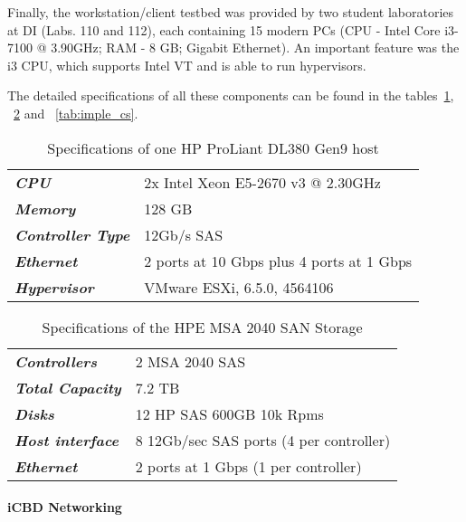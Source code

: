 Finally, the workstation/client testbed was provided by two student laboratories at DI (Labs. 110 and 112), each containing 15 modern PCs (CPU - Intel Core i3-7100 @ 3.90GHz; RAM - 8 GB; Gigabit Ethernet). An important feature was the i3 CPU, which supports Intel VT and is able to run hypervisors.


The detailed specifications of all these components can be found in the tables~\ref{tab:imple_hp}, ~\ref{tab:imple_msa} and ~\ref{tab:imple_cs}.


\begin{table}[htpb]
\centering
\begin{tabular}{ll}
\textit{\textbf{CPU}}             & 2x Intel Xeon E5-2670 v3 @ 2.30GHz        \\
\textit{\textbf{Memory}}          & 128 GB                                    \\
\textit{\textbf{Controller Type}} & 12Gb/s SAS                                \\
\textit{\textbf{Ethernet}}        & 2 ports at 10 Gbps plus 4 ports at 1 Gbps \\
\textit{\textbf{Hypervisor}}      & VMware ESXi, 6.5.0, 4564106              
\end{tabular}
\caption{Specifications of one HP ProLiant DL380 Gen9 host}
\label{tab:imple_hp}
\end{table}

\newpage

\begin{table}[htpb]
\centering
\begin{tabular}{ll}
\textit{\textbf{Controllers}}    & 2 MSA 2040 SAS                          \\
\textit{\textbf{Total Capacity}} & 7.2 TB                                  \\
\textit{\textbf{Disks}}          & 12 HP SAS 600GB 10k Rpms                \\
\textit{\textbf{Host interface}} & 8 12Gb/sec SAS ports (4 per controller) \\
\textit{\textbf{Ethernet}}       & 2 ports at 1 Gbps (1 per controller)   
\end{tabular}
\caption{Specifications of the HPE MSA 2040 SAN Storage}
\label{tab:imple_msa}
\end{table}


\paragraph{iCBD Networking}
\label{par:impl_infra_network}

